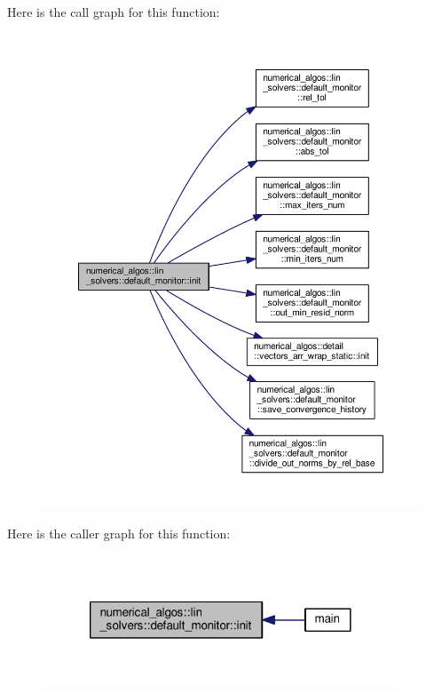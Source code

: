 Here is the call graph for this function\-:
\nopagebreak
\begin{figure}[H]
\begin{center}
\leavevmode
\includegraphics[width=350pt]{classnumerical__algos_1_1lin__solvers_1_1default__monitor_a63f9d87378092ebb0877c099166b9c64_cgraph}
\end{center}
\end{figure}




Here is the caller graph for this function\-:
\nopagebreak
\begin{figure}[H]
\begin{center}
\leavevmode
\includegraphics[width=300pt]{classnumerical__algos_1_1lin__solvers_1_1default__monitor_a63f9d87378092ebb0877c099166b9c64_icgraph}
\end{center}
\end{figure}


